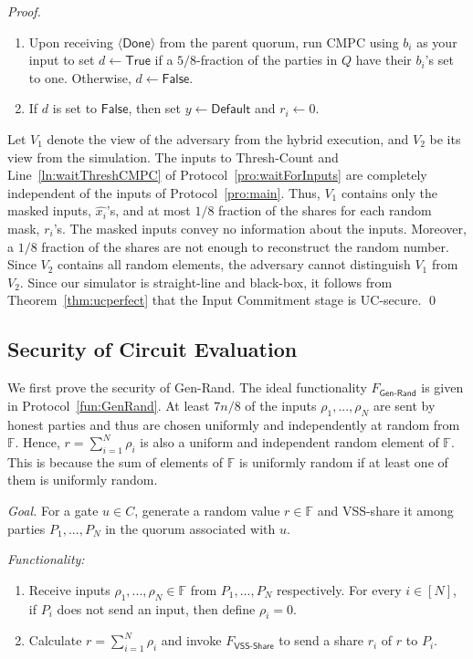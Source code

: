 \documentclass[11pt,letter]{article}
\newcommand{\alg}[1]{\mbox{\textsf{#1}}}
\newcommand{\func}[1]{\mbox{$F_\textsf{#1}$}}
\newcommand{\mask}[1]{\widehat{#1}}
\newcommand{\F}{\mathbb{F}}
\theoremstyle{mytheoremstyle}
\let\savedCaption=\caption
\renewcommand*{\caption}[1]{\savedCaption[#1]{~#1}}
\newcommand{\algfont}{}
\newcommand{\done}{$\langle\mathsf{Done}\rangle$\xspace}
\begin{document}
\begin{proof}
\begin{algorithm}
\begin{enumerate}
\begin{enumerate}
					\item Upon receiving \done from the parent quorum, run \alg{CMPC} using $b_i$ as your input to set $d \gets \textsf{True}$ if a $5/8$-fraction of the parties in $Q$ have their $b_i$'s set to one. Otherwise, $d \gets \textsf{False}$.
					
					\item If $d$ is set to $\textsf{False}$, then set $y \gets \textsf{Default}$ and $r_i \gets 0$.
				\end{enumerate}
		\end{enumerate}
	\end{algorithm}

	Let $V_1$ denote the view of the adversary from the hybrid execution, and $V_2$ be its view from the simulation. The inputs to \textsf{Thresh-Count} and Line~\ref{ln:waitThreshCMPC} of Protocol~\ref{pro:waitForInputs} are completely independent of the inputs of Protocol~\ref{pro:main}. Thus, $V_1$ contains only the masked inputs, $\mask{x_i}$'s, and at most $1/8$ fraction of the shares for each random mask, $r_i$'s. The masked inputs convey no information about the inputs. Moreover, a $1/8$ fraction of the shares are not enough to reconstruct the random number. Since $V_2$ contains all random elements, the adversary cannot distinguish $V_1$ from $V_2$.
	Since our simulator is straight-line and black-box, it follows from Theorem~\ref{thm:ucperfect} that the Input Commitment stage is UC-secure. \qed
\end{proof}

\subsection{Security of Circuit Evaluation}
We first prove the security of \alg{Gen-Rand}. The ideal functionality \func{Gen-Rand} is given in Protocol~\ref{fun:GenRand}. At least $7n/8$ of the inputs $\rho_1,...,\rho_N$ are sent by honest parties and thus are chosen uniformly and independently at random from $\mathbb{F}$. Hence, $r=\sum_{i=1}^{N}\rho_i$ is also a uniform and independent random element of $\mathbb{F}$. This is because the sum of elements of $\F$ is uniformly random if at least one of them is uniformly random.

\begin{algorithm}
	\algfont
	\caption{\func{Gen-Rand}}
	\label{fun:GenRand}
	
	\textit{Goal.} For a gate $u \in C$, generate a random value $r \in \mathbb{F}$ and VSS-share it among parties $P_1,...,P_N$ in the quorum associated with $u$. \medskip
	
	\textit{Functionality:}
	\begin{enumerate}			
		\item Receive inputs $\rho_1,...,\rho_N\in \mathbb{F}$ from $P_1,...,P_N$ respectively. For every $i\in[N]$, if $P_i$ does not send an input, then define $\rho_i = 0$.
		
		\item Calculate $r=\sum_{i=1}^{N}\rho_i$ and invoke \func{VSS-Share} to send a share $r_i$ of $r$ to $P_i$.
	\end{enumerate}
\end{algorithm}
\end{document}
